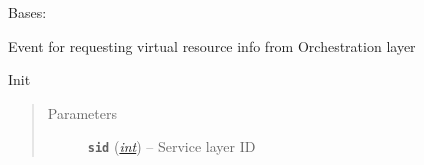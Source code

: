 \documentclass[letterpaper,10pt,english]{sphinxmanual}
\begin{document}
\begin{fulllineitems}
\label{service/sas_API:escape.service.sas_API.GetVirtResInfoEvent}
Bases: 

Event for requesting virtual resource info from Orchestration layer

\begin{fulllineitems}
\label{service/sas_API:escape.service.sas_API.GetVirtResInfoEvent.__init__}
Init
\begin{quote}\begin{description}
\item[{Parameters}] \leavevmode
\textbf{\texttt{sid}} (\href{https://docs.python.org/2.7/library/functions.html\#int}{\emph{int}}) -- Service layer ID

\end{description}\end{quote}

\end{fulllineitems}


\end{fulllineitems}

\end{document}
